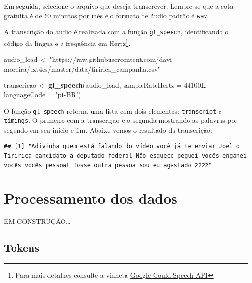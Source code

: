 \documentclass[]{book}
\newenvironment{Shaded}{\begin{snugshade}}{\end{snugshade}}
\newcommand{\DataTypeTok}[1]{\textcolor[rgb]{0.13,0.29,0.53}{#1}}
\newcommand{\KeywordTok}[1]{\textcolor[rgb]{0.13,0.29,0.53}{\textbf{#1}}}
\newcommand{\NormalTok}[1]{#1}
\newcommand{\OperatorTok}[1]{\textcolor[rgb]{0.81,0.36,0.00}{\textbf{#1}}}
\newcommand{\StringTok}[1]{\textcolor[rgb]{0.31,0.60,0.02}{#1}}
\begin{document}
Em seguida, selecione o arquivo que deseja transcrever. Lembre-se que a cota
gratuita é de 60 minutos por mês e o formato de áudio padrão é \texttt{wav}.

A transcrição
do áudio é realizada com a função \texttt{gl\_speech}, identificando o código da língua e a
frequência em Hertz\footnote{Para mais detalhes consulte a vinheta \href{https://cran.r-project.org/web/packages/googleLanguageR/vignettes/speech.html}{Google Could Speech API}}.

\begin{Shaded}
\begin{Highlighting}[]
\NormalTok{audio_load <-}\StringTok{ "https://raw.githubusercontent.com/davi-moreira/txt4cs/master/data/tiririca_campanha.csv"}

\NormalTok{transcricao <-}\StringTok{ }\KeywordTok{gl_speech}\NormalTok{(audio_load, }\DataTypeTok{sampleRateHertz =}\NormalTok{ 44100L, }\DataTypeTok{languageCode =} \StringTok{"pt-BR"}\NormalTok{)}
\end{Highlighting}
\end{Shaded}

O função \texttt{gl\_speech} retorna uma lista com dois elementos: \texttt{transcript} e \texttt{timings}.
O primeiro com a transcrição e o segunda mostrando as palavras por segundo em seu
início e fim. Abaixo vemos o resultado da transcrição:

\begin{Shaded}
\end{Shaded}

\begin{verbatim}
## [1] "Adivinha quem está falando do vídeo você já te enviar Joel o Tiririca candidato a deputado federal Não esquece peguei vocês enganei vocês vocês pessoal fosse outra pessoa sou eu agastado 2222"
\end{verbatim}

\hypertarget{processamento}{%
\chapter{Processamento dos dados}\label{processamento}}

EM CONSTRUÇÃO\ldots{}

\hypertarget{tokens}{%
\section{Tokens}\label{tokens}}
\end{document}
